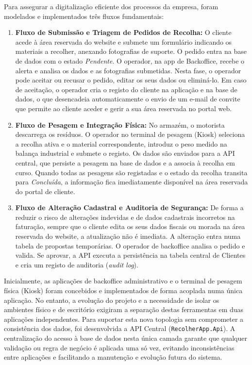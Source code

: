 Para assegurar a digitalização eficiente dos processos da empresa, foram modelados e implementados três fluxos fundamentais:
\begin{enumerate}
    \item \textbf{Fluxo de Submissão e Triagem de Pedidos de Recolha:} O cliente acede à área reservada do website e submete um formulário indicando os materiais a recolher, anexando fotografias de suporte. O pedido entra na base de dados com o estado \textit{Pendente}. O operador, na app de Backoffice, recebe o alerta e analisa os dados e as fotografias submetidas. Nesta fase, o operador pode aceitar ou recusar o pedido, editar os seus dados ou eliminá-lo. Em caso de aceitação, o operador cria o registo do cliente na aplicação e na base de dados, o que desencadeia automaticamente o envio de um e-mail de convite que permite ao cliente aceder e gerir a sua área reservada no portal web.
    \item \textbf{Fluxo de Pesagem e Integração Física:} No armazém, o motorista descarrega os resíduos. O operador no terminal de pesagem (Kiosk) seleciona a recolha ativa e o material correspondente, introduz o peso medido na balança industrial e submete o registo. Os dados são enviados para a API central, que persiste a pesagem na base de dados e a associa à recolha em curso. Quando todas as pesagens são registadas e o estado da recolha transita para \textit{Concluída}, a informação fica imediatamente disponível na área reservada do portal de cliente.
    \item \textbf{Fluxo de Alteração Cadastral e Auditoria de Segurança:} De forma a reduzir o risco de alterações indevidas e de dados cadastrais incorretos na faturação, sempre que o cliente edita os seus dados fiscais ou morada na área reservada do website, a atualização não é imediata. A alteração entra numa tabela de propostas temporárias. O operador de backoffice analisa o pedido e valida. Se aprovar, a API executa a persistência na tabela central de Clientes e cria um registo de auditoria (\textit{audit log}).
\end{enumerate}

Inicialmente, as aplicações de backoffice administrativo e o terminal de pesagem física (Kiosk) foram concebidos e implementados de forma acoplada numa única aplicação. No entanto, a evolução do projeto e a necessidade de isolar os ambientes físico e de escritório exigiram a separação destas ferramentas em duas aplicações independentes. Para suportar esta nova topologia sem comprometer a consistência dos dados, foi desenvolvida a API Central (\texttt{RecolherApp.Api}). A centralização do acesso à base de dados nesta única camada garante que qualquer validação ou regra de negócio é aplicada uma só vez, evitando inconsistências entre aplicações e facilitando a manutenção e evolução futura do sistema.

